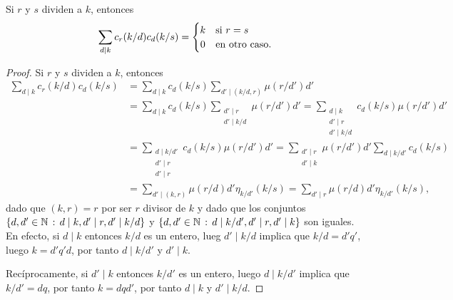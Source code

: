 \begin{lemma}
Si $r$ y $s$ dividen a $k$, entonces
\begin{equation*}
    \sum_{d \mid k} c_r(k/d) c_d(k/s) = \begin{cases}
        \hfil k & \text{si } r = s \\
        \hfil 0 & \text{en otro caso}.
    \end{cases}
\end{equation*}
\end{lemma}
\begin{proof}
Si $r$ y $s$ dividen a $k$, entonces
\begin{equation} \label{eq:ram2}
\begin{split}
\sum_{d \mid k} c_r (k/d) c_d (k/s) &= \sum_{d \mid k} c_d (k/s) \sum_{d' \mid (k/d,r)} \mu (r/d') d' \\
                                                                              &= \sum_{d \mid k} c_d (k/s) \sum_{\substack{d' \mid r \\ d' \mid k/d}} \mu(r/d') d' = \sum_{\substack{d \mid k \\ d' \mid r \\ d' \mid k/d}} c_d (k/s) \mu (r/d') d' \\
                                                                              &= \sum_{\substack{d \mid k/d' \\ d' \mid r \\ d' \mid r}} c_d(k/s) \mu(r/d')  d' = \sum_{\substack{d' \mid r \\ d' \mid k}} \mu(r/d') d' \sum_{d \mid k/d'} c_d(k/s) \\
                                                                              &= \sum_{d' \mid (k,r)} \mu(r/d) d' \eta_{k/d'} (k/s) = \sum_{d' \mid r} \mu(r/d) d' \eta_{k/d'} (k/s),
\end{split}
\end{equation}
dado que $(k,r)=r$ por ser $r$ divisor de $k$ y dado que los conjuntos $\{ d,d' \in \mathbb{N} \, : \, d \mid k, d' \mid r, d' \mid k/d \}$ y $\{ d,d' \in \mathbb{N} \, : \, d \mid k/d', d' \mid r, d' \mid k \}$ son iguales. En efecto, si $d \mid k$ entonces $k/d$ es un entero, lueg $d' \mid k/d$ implica que $k/d=d' q'$, luego $k=d' q' d$, por tanto $d \mid k/d'$ y $d' \mid k$.
\bigskip

Recíprocamente, si $d' \mid k$ entonces $k/d'$ es un entero, luego $d \mid k/d'$ implica que $k/d'=dq$, por tanto $k=d q d'$, por tanto $d \mid k$ y $d' \mid k/d$.
\bigskip


\end{proof}

